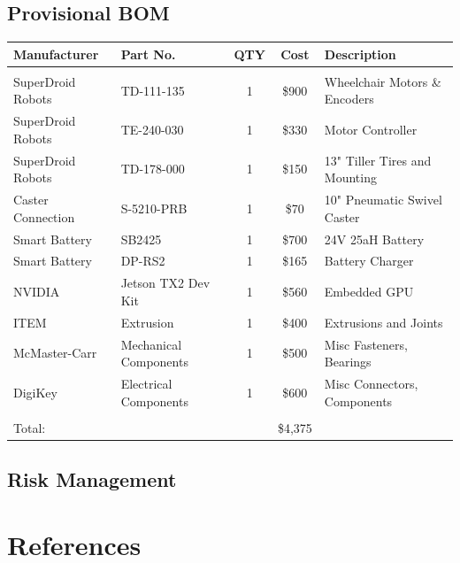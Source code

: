 \documentclass{article}
\begin{document}
\subsection{Provisional BOM}
\begin{table}[H]
\centering
\def\arraystretch{1.1}
\begin{tabular}{ llccl }
 
    Manufacturer & Part No. & QTY & Cost & Description\\
    \hline 
    \\[-.8ex]
    SuperDroid Robots & TD-111-135 & 1 & \$900 & Wheelchair Motors \& Encoders \\
	SuperDroid Robots & TE-240-030 & 1 & \$330 & Motor Controller \\
	SuperDroid Robots & TD-178-000 & 1 & \$150 & 13" Tiller Tires and Mounting \\
	Caster Connection & S-5210-PRB & 1 & \$70 & 10" Pneumatic Swivel Caster \\
	Smart Battery & SB2425 & 1 & \$700 & 24V 25aH Battery \\
    Smart Battery & DP-RS2 & 1 & \$165 & Battery Charger \\
    NVIDIA & Jetson TX2 Dev Kit & 1 & \$560 &  Embedded GPU \\
	ITEM & Extrusion & 1 & \$400 & Extrusions and Joints \\
	McMaster-Carr & Mechanical Components & 1 & \$500 & Misc Fasteners, Bearings \\
	DigiKey & Electrical Components & 1 & \$600 & Misc Connectors, Components \\[.5ex]
	\hline 
	\\[-2ex]
	Total: &&& \$4,375 &\\
	
    
\end{tabular}
\end{table}

\subsection{Risk Management}
\section{References}
\end{document}
